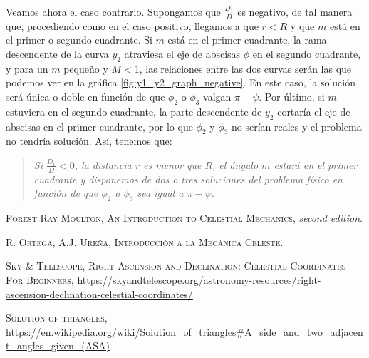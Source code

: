 \documentclass[11pt]{article}
\begin{document}
Veamos ahora el caso contrario. Supongamos que $\frac{D_1}{D}$ es negativo, de tal manera que, procediendo como en el caso positivo, llegamos a que $r<R$ y que $m$ está en el primer o segundo cuadrante. Si $m$ está en el primer cuadrante, la rama descendente de la curva $y_2$ atraviesa el eje de abscisas $\phi$ en el segundo cuadrante, y para un $m$ pequeño y $M<1$, las relaciones entre las dos curvas serán las que podemos ver en la gráfica \ref{fig:y1_y2_graph_negative}. En este caso, la solución será única o doble en función de que $\phi_2$ o $\phi_3$ valgan $\pi-\psi$. Por último, si $m$ estuviera en el segundo cuadrante, la parte descendente de $y_2$ cortaría el eje de abscisas en el primer cuadrante, por lo que $\phi_2$ y $\phi_3$ no serían reales y el problema no tendría solución. Así, tenemos que:
\begin{quote}
\textit{Si $\frac{D_1}{D}<0$, la distancia $r$ es menor que $R$, el ángulo $m$ estará en el primer cuadrante y disponemos de dos o tres soluciones del problema físico en función de que $\phi_2$ o $\phi_3$ sea igual a $\pi-\psi$.}\\
\end{quote}










\newpage

\begin{thebibliography}{99}
 \textsc{Forest Ray Moulton}, \textsc{An Introduction to Celestial Mechanics}, \textit{second edition}.

 \textsc{R. Ortega, A.J. Ureña}, \textsc{Introducción a la Mecánica Celeste}.

 \textsc{Sky \& Telescope}, \textsc{Right Ascension and Declination: Celestial Coordinates For Beginners}, \url{https://skyandtelescope.org/astronomy-resources/right-ascension-declination-celestial-coordinates/}

 \textsc{Solution of triangles}, \url{https://en.wikipedia.org/wiki/Solution_of_triangles#A_side_and_two_adjacent_angles_given_(ASA)}

\end{thebibliography}
\end{document}
